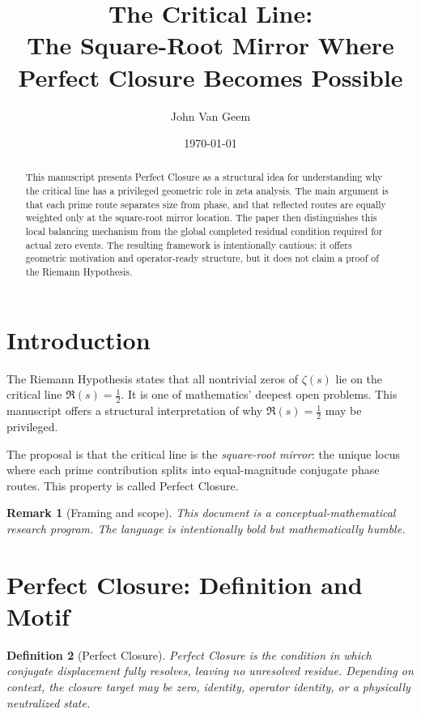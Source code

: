 \documentclass[11pt]{article}
\title{The Critical Line: \\ The Square-Root Mirror Where Perfect Closure Becomes Possible}
\author{John Van Geem}
\affil{RQM Technologies}
\date{\today}
\newtheorem{definition}{Definition}[section]
\newtheorem{remark}[definition]{Remark}
\begin{document}
\maketitle

\begin{abstract}
This manuscript presents Perfect Closure as a structural idea for understanding why the critical line has a privileged geometric role in zeta analysis. The main argument is that each prime route separates size from phase, and that reflected routes are equally weighted only at the square-root mirror location. The paper then distinguishes this local balancing mechanism from the global completed residual condition required for actual zero events. The resulting framework is intentionally cautious: it offers geometric motivation and operator-ready structure, but it does not claim a proof of the Riemann Hypothesis.
\end{abstract}

\section{Introduction}

The Riemann Hypothesis states that all nontrivial zeros of $\zeta(s)$ lie on the critical line $\Re(s)=\tfrac{1}{2}$. It is one of mathematics' deepest open problems. This manuscript offers a structural interpretation of why $\Re(s)=\tfrac{1}{2}$ may be privileged.

The proposal is that the critical line is the \emph{square-root mirror}: the unique locus where each prime contribution splits into equal-magnitude conjugate phase routes. This property is called Perfect Closure.

\begin{remark}[Framing and scope]
This document is a conceptual-mathematical research program. The language is intentionally bold but mathematically humble.
\end{remark}

\section{Perfect Closure: Definition and Motif}

\begin{definition}[Perfect Closure]
\emph{Perfect Closure} is the condition in which conjugate displacement fully resolves, leaving no unresolved residue. Depending on context, the closure target may be zero, identity, operator identity, or a physically neutralized state.
\end{definition}
\end{document}
